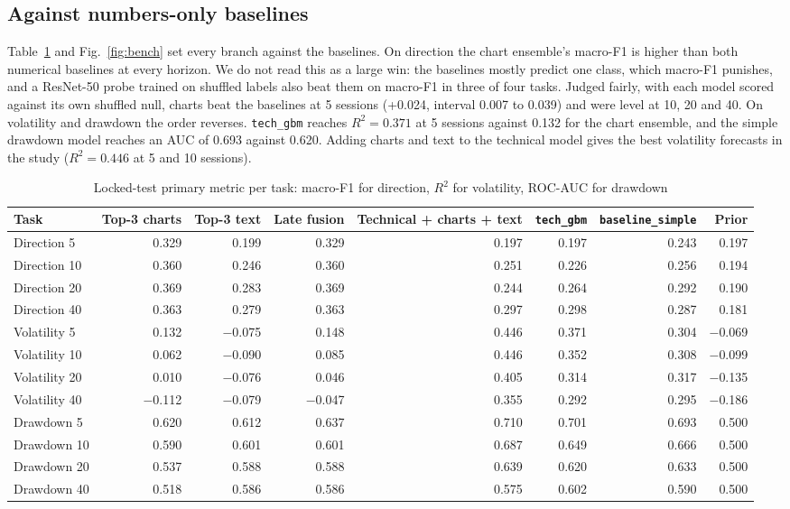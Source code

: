 \documentclass[conference]{IEEEtran}
\begin{document}
\subsection{Against numbers-only baselines}

Table~\ref{tab:main} and Fig.~\ref{fig:bench} set every branch against the baselines. On direction the chart ensemble's macro-F1 is higher than both numerical baselines at every horizon. We do not read this as a large win: the baselines mostly predict one class, which macro-F1 punishes, and a ResNet-50 probe trained on shuffled labels also beat them on macro-F1 in three of four tasks. Judged fairly, with each model scored against its own shuffled null, charts beat the baselines at 5 sessions (+0.024, interval 0.007 to 0.039) and were level at 10, 20 and 40. On volatility and drawdown the order reverses. \texttt{tech\_gbm} reaches $R^2 = 0.371$ at 5 sessions against 0.132 for the chart ensemble, and the simple drawdown model reaches an AUC of 0.693 against 0.620. Adding charts and text to the technical model gives the best volatility forecasts in the study ($R^2 = 0.446$ at 5 and 10 sessions).

\begin{table}[t]
\caption{Locked-test primary metric per task: macro-F1 for direction, $R^2$ for volatility, ROC-AUC for drawdown}
\label{tab:main}
\centering
\begin{tabular}{lrrrrrrr}
\toprule
Task & Top-3 charts & Top-3 text & Late fusion & Technical + charts + text & \texttt{tech\_gbm} & \texttt{baseline\_simple} & Prior \\
\midrule
Direction 5 & 0.329 & 0.199 & 0.329 & 0.197 & 0.197 & 0.243 & 0.197 \\
Direction 10 & 0.360 & 0.246 & 0.360 & 0.251 & 0.226 & 0.256 & 0.194 \\
Direction 20 & 0.369 & 0.283 & 0.369 & 0.244 & 0.264 & 0.292 & 0.190 \\
Direction 40 & 0.363 & 0.279 & 0.363 & 0.297 & 0.298 & 0.287 & 0.181 \\
Volatility 5 & 0.132 & $-$0.075 & 0.148 & 0.446 & 0.371 & 0.304 & $-$0.069 \\
Volatility 10 & 0.062 & $-$0.090 & 0.085 & 0.446 & 0.352 & 0.308 & $-$0.099 \\
Volatility 20 & 0.010 & $-$0.076 & 0.046 & 0.405 & 0.314 & 0.317 & $-$0.135 \\
Volatility 40 & $-$0.112 & $-$0.079 & $-$0.047 & 0.355 & 0.292 & 0.295 & $-$0.186 \\
Drawdown 5 & 0.620 & 0.612 & 0.637 & 0.710 & 0.701 & 0.693 & 0.500 \\
Drawdown 10 & 0.590 & 0.601 & 0.601 & 0.687 & 0.649 & 0.666 & 0.500 \\
Drawdown 20 & 0.537 & 0.588 & 0.588 & 0.639 & 0.620 & 0.633 & 0.500 \\
Drawdown 40 & 0.518 & 0.586 & 0.586 & 0.575 & 0.602 & 0.590 & 0.500 \\
\bottomrule
\end{tabular}
\end{table}
\end{document}
